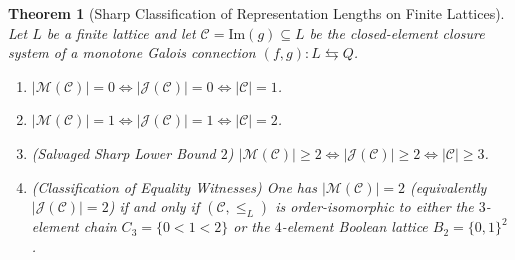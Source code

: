 \documentclass[11pt,a4paper]{article}
\newtheorem{theorem}{Theorem}[section]
\theoremstyle{definition}
\theoremstyle{remark}
\begin{document}
\begin{theorem}[Sharp Classification of Representation Lengths on Finite Lattices]\label{thm:classification}
Let $L$ be a finite lattice and let $\mathcal{C} = \mathrm{Im}(g) \subseteq L$ be the closed-element closure system of a monotone Galois connection $(f, g) : L \leftrightarrows Q$.
\begin{enumerate}
\item $|\mathcal{M}(\mathcal{C})| = 0 \iff |\mathcal{J}(\mathcal{C})| = 0 \iff |\mathcal{C}| = 1$.
\item $|\mathcal{M}(\mathcal{C})| = 1 \iff |\mathcal{J}(\mathcal{C})| = 1 \iff |\mathcal{C}| = 2$.
\item \emph{(Salvaged Sharp Lower Bound $2$)} $|\mathcal{M}(\mathcal{C})| \ge 2 \iff |\mathcal{J}(\mathcal{C})| \ge 2 \iff |\mathcal{C}| \ge 3$.
\item \emph{(Classification of Equality Witnesses)} One has $|\mathcal{M}(\mathcal{C})| = 2$ (equivalently $|\mathcal{J}(\mathcal{C})| = 2$) if and only if $(\mathcal{C}, \le_L)$ is order-isomorphic to either the $3$-element chain $C_3 = \{0 < 1 < 2\}$ or the $4$-element Boolean lattice $B_2 = \{0, 1\}^2$.
\end{enumerate}
\end{theorem}
\end{document}
